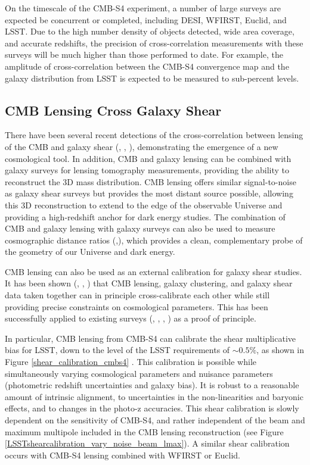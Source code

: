 On the timescale of the CMB-S4 experiment, a number of large surveys are expected be concurrent or completed, including DESI, WFIRST, Euclid, and LSST.  Due to the high number density of objects detected, wide area coverage, and accurate redshifts, the precision of cross-correlation measurements with these surveys will be much higher than those performed to date.  For example, the amplitude of cross-correlation between the CMB-S4 convergence map and the galaxy distribution from LSST is expected to be measured to sub-percent levels.  


\subsection{CMB Lensing Cross Galaxy Shear}\label{lensxlens}


There have been several recent detections of the cross-correlation between lensing of the CMB and galaxy shear (\cite{Hand:2013xua}, \cite{Liu:2015xfa}, \cite{Kirk:2015dpw}), demonstrating the emergence of a new cosmological tool. In addition, CMB and galaxy lensing can be combined with galaxy surveys for lensing tomography measurements, providing the ability to reconstruct the 3D mass distribution. CMB lensing offers similar signal-to-noise as galaxy shear surveys but provides the most distant source possible, allowing this 3D reconstruction to extend to the edge of the observable Universe and providing a high-redshift anchor for dark energy studies.  The combination of CMB and galaxy lensing with galaxy surveys can also be used to measure cosmographic distance ratios (\cite{Miyatake:2016gdc},\cite{Singh:2016xey}), which provides a clean, complementary probe of the geometry of our Universe and dark energy. 

CMB lensing can also be used as an external calibration for galaxy shear studies. It has been shown (\cite{Vallinotto:2011ge}, \cite{Vallinotto:2013eva}, \cite{Das:2013aia}) that CMB lensing, galaxy clustering, and galaxy shear data taken together can in principle cross-calibrate each other while still providing precise constraints on cosmological parameters. This has been successfully applied to existing surveys (\cite{Liu:2015xfa}, \cite{Baxter:2016ziy}, \cite{Miyatake:2016gdc}, \cite{Singh:2016xey}) as a proof of principle. 

In particular, CMB lensing from CMB-S4 can calibrate the shear multiplicative bias for LSST, down to the level of the LSST requirements of $\sim 0.5\%$, as shown in Figure \ref{shear_calibration_cmbs4} \cite{Schaan:2016ois}. This calibration is possible while simultaneously varying cosmological parameters and nuisance parameters (photometric redshift uncertainties and galaxy bias). It is robust to a reasonable amount of intrinsic alignment, to uncertainties in the non-linearities and baryonic effects, and to changes in the photo-z accuracies. This shear calibration is slowly dependent on the sensitivity of CMB-S4, and rather independent of the beam and maximum multipole included in the CMB lensing reconstruction (see Figure \ref{LSSTshearcalibration_vary_noise_beam_lmax}). A similar shear calibration occurs with CMB-S4 lensing combined with WFIRST or Euclid. 

